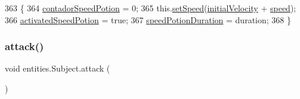 \begin{DoxyCode}
363                                                                \{
364         \mbox{\hyperlink{classentities_1_1_subject_a1237103969aa7b4476849d5d7364a8d2}{contadorSpeedPotion}} = 0;
365         this.\mbox{\hyperlink{classentities_1_1_mobile_entity_a8b9394d985435fba88149c9dded2e69d}{setSpeed}}(\mbox{\hyperlink{classentities_1_1_subject_a6a3d42736a480a8e510f7c316c7d7ad7}{initialVelocity}} + \mbox{\hyperlink{classentities_1_1_mobile_entity_a815a9d2b23a0bb7e3ee7739d4c10d7c3}{speed}});
366         \mbox{\hyperlink{classentities_1_1_subject_a93bf55544d557dfedf72520adb83f164}{activatedSpeedPotion}} = \textcolor{keyword}{true};
367         \mbox{\hyperlink{classentities_1_1_subject_adcbbeb784303a8b3ec6df589655a0eb9}{speedPotionDuration}} = duration;
368     \}
\end{DoxyCode}
\mbox{\label{classentities_1_1_subject_a97663ba9e9a8708bf9affe4d9bf8de65}} 
\subsubsection{\texorpdfstring{attack()}{attack()}}
{\footnotesize\ttfamily void entities.\+Subject.\+attack (\begin{DoxyParamCaption}{ }\end{DoxyParamCaption})\hspace{0.3cm}{\ttfamily [inline]}}


